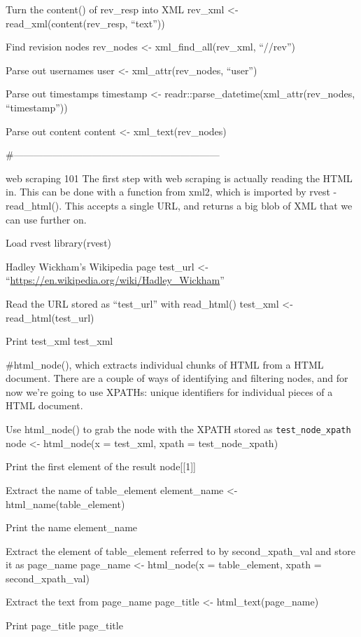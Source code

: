 \documentclass[]{book}
\begin{document}
Turn the content() of rev\_resp into XML
rev\_xml \textless{}- read\_xml(content(rev\_resp, ``text''))

Find revision nodes
rev\_nodes \textless{}- xml\_find\_all(rev\_xml, ``//rev'')

Parse out usernames
user \textless{}- xml\_attr(rev\_nodes, ``user'')

Parse out timestamps
timestamp \textless{}- readr::parse\_datetime(xml\_attr(rev\_nodes, ``timestamp''))

Parse out content
content \textless{}- xml\_text(rev\_nodes)

\#---------------------------------------------------------------

web scraping 101
The first step with web scraping is actually reading the HTML in.
This can be done with a function from xml2, which is imported by rvest - read\_html().
This accepts a single URL, and returns a big blob of XML that we can use further on.

Load rvest
library(rvest)

Hadley Wickham's Wikipedia page
test\_url \textless{}- ``\url{https://en.wikipedia.org/wiki/Hadley_Wickham}''

Read the URL stored as ``test\_url'' with read\_html()
test\_xml \textless{}- read\_html(test\_url)

Print test\_xml
test\_xml

\#html\_node(), which extracts individual chunks of HTML from a HTML document.
There are a couple of ways of identifying and filtering nodes, and for now we're going to use XPATHs:
unique identifiers for individual pieces of a HTML document.

Use html\_node() to grab the node with the XPATH stored as \texttt{test\_node\_xpath}
node \textless{}- html\_node(x = test\_xml, xpath = test\_node\_xpath)

Print the first element of the result
node{[}{[}1{]}{]}

Extract the name of table\_element
element\_name \textless{}- html\_name(table\_element)

Print the name
element\_name

Extract the element of table\_element referred to by second\_xpath\_val and store it as page\_name
page\_name \textless{}- html\_node(x = table\_element, xpath = second\_xpath\_val)

Extract the text from page\_name
page\_title \textless{}- html\_text(page\_name)

Print page\_title
page\_title
\end{document}
